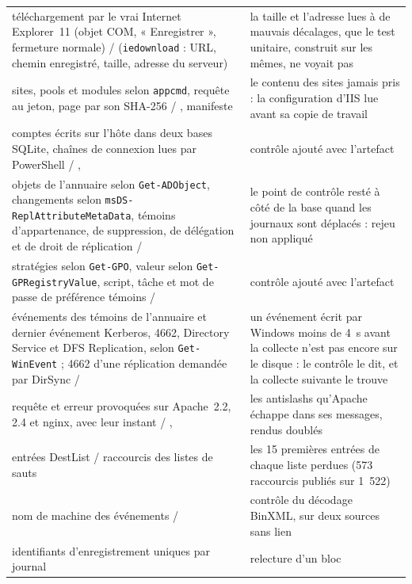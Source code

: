 \documentclass[11pt,a4paper,oneside]{report}
\begin{document}
\begin{longtable}{@{}L{6.6cm}L{8.4cm}@{}}
téléchargement par le vrai Internet Explorer~11 (objet COM, « Enregistrer »,
  fermeture normale) /  (\texttt{iedownload} :
  URL, chemin enregistré, taille, adresse du serveur) &
  la taille et l'adresse lues à de mauvais décalages, que le test unitaire,
  construit sur les mêmes, ne voyait pas \\
sites, pools et modules selon \texttt{appcmd}, requête au jeton, page par son
  SHA-256 / , manifeste &
  le contenu des sites jamais pris : la configuration d'IIS lue avant sa copie
  de travail \\
comptes écrits sur l'hôte dans deux bases SQLite, chaînes de connexion lues par
  PowerShell / ,
   &
  contrôle ajouté avec l'artefact \\
objets de l'annuaire selon \texttt{Get-ADObject}, changements selon
  \texttt{msDS-ReplAttributeMetaData}, témoins d'appartenance, de
  suppression, de délégation et de droit de réplication /
   &
  le point de contrôle resté à côté de la base quand les journaux sont déplacés :
  rejeu non appliqué \\
stratégies selon \texttt{Get-GPO}, valeur selon \texttt{Get-GPRegistryValue},
  script, tâche et mot de passe de préférence témoins /
   & contrôle ajouté avec l'artefact \\
événements des témoins de l'annuaire et dernier événement Kerberos, 4662,
  Directory Service et DFS Replication, selon \texttt{Get-WinEvent} ; 4662
  d'une réplication demandée par DirSync /  & un événement
  écrit par Windows moins de 4~s avant la collecte n'est pas encore sur le disque :
  le contrôle le dit, et la collecte suivante le trouve \\
requête et erreur provoquées sur Apache~2.2, 2.4 et nginx, avec leur instant /
  ,  &
  les antislashs qu'Apache échappe dans ses messages, rendus doublés \\
entrées DestList / raccourcis des listes de sauts & les 15 premières entrées de
  chaque liste perdues (573 raccourcis publiés sur 1~522) \\
nom de machine des événements /  & contrôle du
  décodage BinXML, sur deux sources sans lien \\
identifiants d'enregistrement uniques par journal & relecture d'un bloc

\end{longtable}
\end{document}

